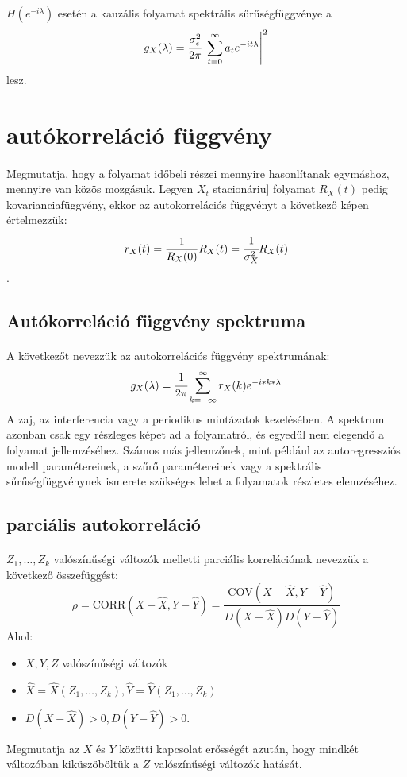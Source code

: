 \documentclass[11pt,a4paper]{article}
\begin{document}
					\paragraph{}
						$H \left(e^{-i \lambda} \right)$ esetén a kauzális folyamat spektrális sűrűségfüggvénye a
						$$g_X(\lambda) = \cfrac{\sigma_\epsilon^2}{2 \pi} \left| \sum_{t=0}^\infty a_t e^{-it\lambda}\right|^2$$ lesz.
			\section{autókorreláció függvény}
				\paragraph{}
					Megmutatja, hogy a folyamat időbeli részei mennyire hasonlítanak egymáshoz, mennyire van közös mozgásuk.
					Legyen $X_t$ stacionáriu] folyamat $R_X(t)$ pedig kovarianciafüggvény, ekkor az autokorrelációs függvényt a következő képen értelmezzük:
					$$r_X(t) = \dfrac{1}{R_X(0)}R_X(t) = \cfrac{1}{\sigma_X^2}R_X(t)$$.
				\subsection{Autókorreláció függvény spektruma}
					\paragraph{}
						A következőt nevezzük az autokorrelációs függvény spektrumának:
						$$g_X(\lambda) = \cfrac{1}{2 \pi} \sum_{k = - \infty} ^{\infty} r_X(k) e^{-i * k *\lambda}$$
						A zaj, az interferencia vagy a periodikus mintázatok kezelésében. A spektrum azonban csak egy részleges képet ad a folyamatról, és egyedül nem elegendő a folyamat jellemzéséhez. Számos más jellemzőnek, mint például az autoregressziós modell paramétereinek, a szűrő paramétereinek vagy a spektrális sűrűségfüggvénynek ismerete szükséges lehet a folyamatok részletes elemzéséhez.
				\subsection{parciális autokorreláció}
					\paragraph{}
						$Z_1, \dots, Z_k$ valószínűségi változók melletti parciális korrelációnak nevezzük a következő összefüggést:
						$$\rho = \mathrm{CORR}(X - \hat{X}, Y - \hat{Y}) = \frac{\mathrm{COV}(X-\hat{X}, Y - \hat{Y})}{D(X - \hat{X})D(Y - \hat{Y})}$$
						Ahol:
						\begin{itemize}
							\item $X,Y,Z$ valószínűségi változók
							\item $\hat{X} = \hat{X}(Z_1, \dots, Z_k), \hat{Y} = \hat{Y}(Z_1, \dots, Z_k)$
							\item $D(X - \hat{X}) > 0, D(Y - \hat{Y}) > 0$.
						\end{itemize}
						Megmutatja az $X$ és $Y$ közötti kapcsolat erősségét azután, hogy mindkét változóban kiküszöböltük a $Z$ valószínűségi változók hatását.
\end{document}
